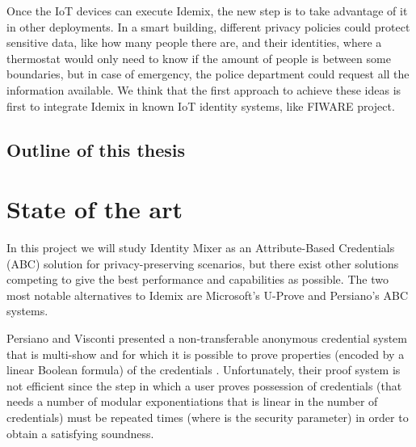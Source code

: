 \documentclass[journal]{IEEEtran}
\begin{document}
Once the IoT devices can execute Idemix, the new step is to take advantage of it in other deployments. In a smart building, different privacy policies could protect sensitive data, like how many people there are, and their identities, where a thermostat would only need to know if the amount of people is between some boundaries, but in case of emergency, the police department could request all the information available. We think that the first approach to achieve these ideas is first to integrate Idemix in known IoT identity systems, like FIWARE project. 

\hfil


\subsection{Outline of this thesis}




\section{State of the art}

In this project we will study Identity Mixer as an Attribute-Based Credentials (ABC) solution for privacy-preserving scenarios, but there exist other solutions competing to give the best performance and capabilities as possible. The two most notable alternatives to Idemix are Microsoft's U-Prove and Persiano's ABC systems.




Persiano and Visconti presented a non-transferable anonymous
credential system that is multi-show and for which it is possible to prove
properties (encoded by a linear Boolean formula) of the credentials \cite{book:185217}. Unfortunately, their proof system is not efficient since the step in which a user proves
possession of credentials (that needs a number of modular exponentiations that
is linear in the number of credentials) must be repeated times (where is the
security parameter) in order to obtain a satisfying soundness.
\end{document}
